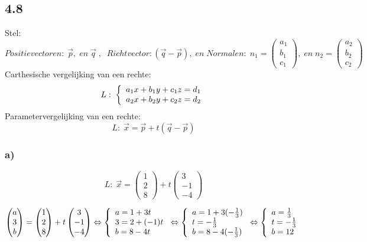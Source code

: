\documentclass[11pt]{article}
\begin{document}
\subsection*{4.8}
Stel:\\
\[Positievectoren:\;\vec{p},\;en\;\vec{q}\;,\;\;Richtvector: (\vec{q}-\vec{p}),\;en\; Normalen:\; n_1=\begin{pmatrix}
a_1\\b_1\\c_1
\end{pmatrix},\;en\;n_2=\begin{pmatrix}
a_2\\b_2\\c_2
\end{pmatrix}\]
Carthesische vergelijking van een rechte:\\
\[L:\;
\left\lbrace
\begin{array}{l l}
a_1x+b_1y+c_1z=d_1\\
a_2x+b_2y+c_2z=d_2
\end{array}
\right.
\]
Parametervergelijking van een rechte:\\
\[L:\; \vec{x}=\vec{p}+t(\vec{q}-\vec{p})\]
\subsubsection*{a)}
\[L:\; \vec{x}=\begin{pmatrix}
1\\2\\8
\end{pmatrix}+t\begin{pmatrix}
3\\-1\\-4
\end{pmatrix}\]

\[\begin{pmatrix}
a\\3\\b
\end{pmatrix}=\begin{pmatrix}
1\\2\\8
\end{pmatrix}+t\begin{pmatrix}
3\\-1\\-4
\end{pmatrix}\Leftrightarrow\left\lbrace\begin{array}{l l}
a=1+3t\\
3=2+(-1)t\\
b=8-4t
\end{array}\right.\Leftrightarrow\left\lbrace\begin{array}{l l}
a=1+3(-\frac{1}{3})\\
t=-\frac{1}{3}\\
b=8-4(-\frac{1}{3})
\end{array}\right.\Leftrightarrow\left\lbrace\begin{array}{l l}
a=\frac{1}{3}\\
t=-\frac{1}{3}\\
b=12
\end{array}\right.\]
\end{document}
